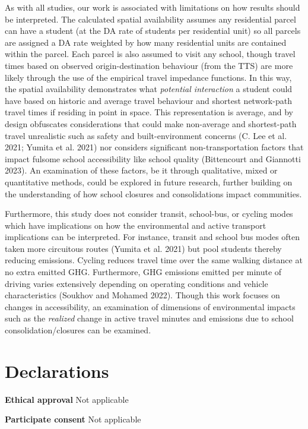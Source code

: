\documentclass[
default
]{sn-jnl}
\begin{document}
As with all studies, our work is associated with limitations on how
results should be interpreted. The calculated spatial availability
assumes any residential parcel can have a student (at the DA rate of
students per residential unit) so all parcels are assigned a DA rate
weighted by how many residential units are contained within the parcel.
Each parcel is also assumed to visit any school, though travel times
based on observed origin-destination behaviour (from the TTS) are more
likely through the use of the empirical travel impedance functions. In
this way, the spatial availability demonstrates what \emph{potential
interaction} a student could have based on historic and average travel
behaviour and shortest network-path travel times if residing in point in
space. This representation is average, and by design obfuscates
considerations that could make non-average and shortest-path travel
unrealistic such as safety and built-environment concerns (C. Lee et al.
2021; Yumita et al. 2021) nor considers significant non-transportation
factors that impact fulsome school accessibility like school quality
(Bittencourt and Giannotti 2023). An examination of these factors, be it
through qualitative, mixed or quantitative methods, could be explored in
future research, further building on the understanding of how school
closures and consolidations impact communities.

Furthermore, this study does not consider transit, school-bus, or
cycling modes which have implications on how the environmental and
active transport implications can be interpreted. For instance, transit
and school bus modes often taken more circuitous routes (Yumita et al.
2021) but pool students thereby reducing emissions. Cycling reduces
travel time over the same walking distance at no extra emitted GHG.
Furthermore, GHG emissions emitted per minute of driving varies
extensively depending on operating conditions and vehicle
characteristics (Soukhov and Mohamed 2022). Though this work focuses on
changes in accessibility, an examination of dimensions of environmental
impacts such as the \emph{realized} change in active travel minutes and
emissions due to school consolidation/closures can be examined.

\section{Declarations}\label{declarations}

\textbf{Ethical approval} Not applicable

\textbf{Participate consent} Not applicable
\end{document}
